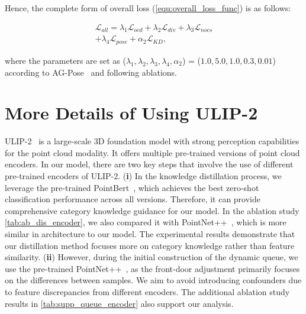 Hence, the complete form of overall loss (\cref{equ:overall_loss_func}) is as follows:
\begin{small} 
\begin{equation}
\begin{split}
    \mathcal{L}_{all} = \lambda_1\mathcal{L}_{ocd} + \lambda_2\mathcal{L}_{div} + \lambda_3\mathcal{L}_{nocs} \\ + \lambda_4\mathcal{L}_{pose} + \alpha_{2}\mathcal{L}_{KD}, \label{equ:supp_overall_loss}
\end{split}
\end{equation}
\end{small}
where the parameters are set as ($\lambda_1,\lambda_2,\lambda_3,\lambda_4,\alpha_{2}$) = ($1.0,5.0,1.0,0.3,0.01$) according to AG-Pose~\cite{lin2024instance} and following ablations.


\section{More Details of Using ULIP-2}
\label{sec:suppl_use_ulip2}
ULIP-2~\cite{xue2024ulip} is a large-scale 3D foundation model with strong perception capabilities for the point cloud modality. It offers multiple pre-trained versions of point cloud encoders. In our model, there are two key steps that involve the use of different pre-trained encoders of ULIP-2.
(\textbf{i}) In the knowledge distillation process, we leverage the pre-trained PointBert~\cite{yu2022point}, which achieves the best zero-shot classification performance across all versions. Therefore, it can provide comprehensive category knowledge guidance for our model. In the ablation study \cref{tab:ab_dis_encoder}, we also compared it with PointNet++~\cite{qi2017pointnet++}, which is more similar in architecture to our model. The experimental results demonstrate that our distillation method focuses more on category knowledge rather than feature similarity.
(\textbf{ii}) However, during the initial construction of the dynamic queue, we use the pre-trained PointNet++~\cite{qi2017pointnet++}, as the front-door adjustment primarily focuses on the differences between samples. We aim to avoid introducing confounders due to feature discrepancies from different encoders. The additional ablation study results in \cref{tab:supp_queue_encoder} also support our analysis.

